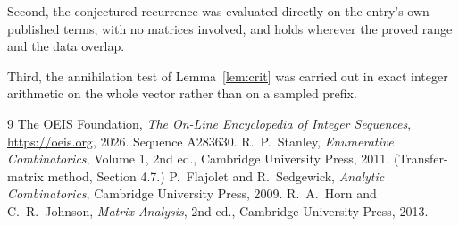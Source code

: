 \documentclass[11pt,a4paper]{article}
\theoremstyle{plain}
\theoremstyle{definition}
\begin{document}
Second, the conjectured recurrence was evaluated directly on the entry's own published terms,
with no matrices involved, and holds wherever the proved range and the data overlap.

Third, the annihilation test of Lemma~\ref{lem:crit} was carried out in exact integer
arithmetic on the whole vector rather than on a sampled prefix.

\begin{thebibliography}{9}
 The OEIS Foundation, \emph{The On-Line Encyclopedia of Integer
Sequences}, \url{https://oeis.org}, 2026. Sequence A283630.
 R.~P.~Stanley, \emph{Enumerative Combinatorics}, Volume 1, 2nd ed.,
Cambridge University Press, 2011. (Transfer-matrix method, Section 4.7.)
 P.~Flajolet and R.~Sedgewick, \emph{Analytic Combinatorics}, Cambridge
University Press, 2009.
 R.~A.~Horn and C.~R.~Johnson, \emph{Matrix Analysis}, 2nd ed., Cambridge
University Press, 2013.
\end{thebibliography}
\end{document}
